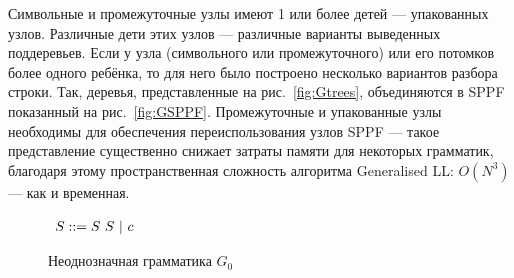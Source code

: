 \documentclass[14pt]{matmex-diploma-custom}
\begin{document}
    Символьные и промежуточные узлы имеют 1 или более детей --- упакованных узлов.
    Различные дети этих узлов --- различные варианты выведенных поддеревьев.
    Если у узла (символьного или промежуточного) или его потомков более одного ребёнка, то для него было построено несколько вариантов 
    разбора строки. Так, деревья, представленные на рис.~\ref{fig:Gtrees}, объединяются в SPPF показанный на рис.~\ref{fig:GSPPF}.
    Промежуточные и упакованные узлы необходимы для обеспечения переиспользования узлов SPPF --- такое представление существенно снижает
    затраты памяти для некоторых грамматик, благодаря этому пространственная сложность алгоритма Generalised LL: $O(N^3)$ --- как и временная.
    
    \begin{figure}
    	\centering
    	$
    	\begin{array}[b]{rl}
    	S ::= S\ S\ | \ c \ \ \ 
    	\end{array}
    	$
    	\caption{Неоднозначная грамматика $G_0$}
    	\label{fig:fig0}
    \end{figure}
\end{document}
